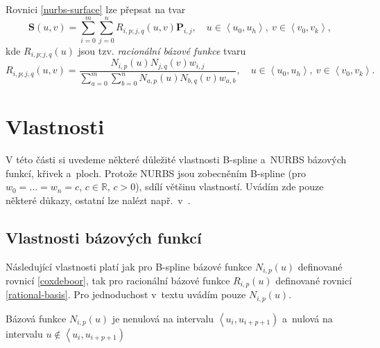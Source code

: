 \begin{veta}
	Rovnici \eqref{nurbs-surface} lze přepsat na tvar
	\begin{equation}
	\mathbf{S}\left(u,v\right)=\sum _{i=0}^{m}\sum _{j=0}^{n}{R}_{i,p;j,q}\left(u,v\right)\mathbf{P}_{i,j}, \quad u \in \left\langle u_0,u_h \right\rangle,\ v \in \left\langle v_0,v_k \right\rangle,
	\end{equation}
	kde ${R}_{i,p;j,q}\left( u \right)$ jsou tzv. \emph{racionální bázové funkce} tvaru
	\begin{equation}\label{R_ij}
	{R}_{i,p;j,q}\left(u,v\right)=\frac{{N}_{i,p}\left(u\right){N}_{j,q}\left(v\right)w_{i,j}}{\sum _{a=0}^{m}\sum _{b=0}^{n}{N}_{a,p}\left(u\right){N}_{b,q}\left(v\right)w_{a,b}}, \quad u \in \left\langle u_0,u_h \right\rangle,\ v \in \left\langle v_0,v_k \right\rangle.
	\end{equation}
\end{veta}


\section{Vlastnosti}\label{cast24}
V této části si uvedeme některé důležité vlastnosti B-spline a~NURBS bázových funkcí, křivek a~ploch. Protože NURBS jsou zobecněním B-spline (pro $w_0=\dots=w_n=c$, $c\in\mathbb{R}$, $c>0$), sdílí většinu vlastností. Uvádím zde pouze některé důkazy, ostatní lze nalézt např.~v~\cite{Pieglc1997,Shenec19972014}.

\subsection{Vlastnosti bázových funkcí}

Následující vlastnosti platí jak pro B-spline bázové funkce $N_{i,p}\left(u\right)$ definované rovnicí \eqref{coxdeboor}, tak pro racionální bázové funkce $R_{i,p}\left(u\right)$ definované rovnicí \eqref{rational-basis}. Pro jednoduchost v~textu uvádím pouze $N_{i,p}\left(u\right)$.

%

\begin{veta}\label{local-support}
	Bázová funkce ${N}_{i,p}\left(u\right)$ je nenulová na intervalu $\left\langle u_i, u_{i+p+1}\right)$ a~nulová na intervalu $u\notin\left\langle u_i, u_{i+p+1}\right)$
\end{veta}

